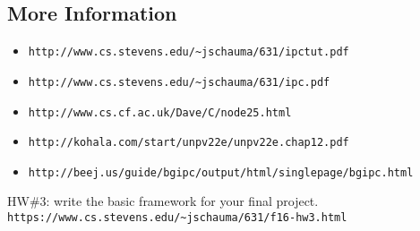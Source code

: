 \documentclass[xga]{xdvislides}
\begin{document}
\subsection{More Information}
\begin{itemize}
	\item \verb+http://www.cs.stevens.edu/~jschauma/631/ipctut.pdf+
	\item \verb+http://www.cs.stevens.edu/~jschauma/631/ipc.pdf+
	\item \verb+http://www.cs.cf.ac.uk/Dave/C/node25.html+
	\item \verb+http://kohala.com/start/unpv22e/unpv22e.chap12.pdf+
	\item \verb+http://beej.us/guide/bgipc/output/html/singlepage/bgipc.html+
\end{itemize}
\vspace{.5in}

HW\#3: write the basic framework for your final project. \\
\verb+https://www.cs.stevens.edu/~jschauma/631/f16-hw3.html+
\end{document}
